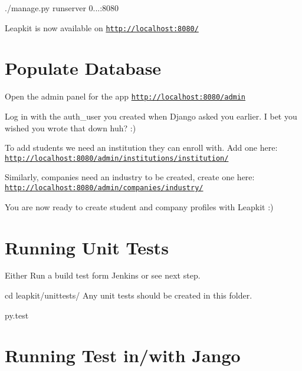 \begin{DoxyItemize}
\item {\ttfamily ./manage.py runserver 0...\-:8080}
\item Leapkit is now available on \href{http://localhost:8080/}{\tt http\-://localhost\-:8080/}
\end{DoxyItemize}

\section*{Populate Database }


\begin{DoxyItemize}
\item Open the admin panel for the app \href{http://localhost:8080/admin}{\tt http\-://localhost\-:8080/admin}
\item Log in with the auth\-\_\-user you created when Django asked you earlier. I bet you wished you wrote that down huh? \-:)
\item To add students we need an institution they can enroll with. Add one here\-: \href{http://localhost:8080/admin/institutions/institution/}{\tt http\-://localhost\-:8080/admin/institutions/institution/}
\item Similarly, companies need an industry to be created, create one here\-: \href{http://localhost:8080/admin/companies/industry/}{\tt http\-://localhost\-:8080/admin/companies/industry/}
\item You are now ready to create student and company profiles with Leapkit \-:)
\end{DoxyItemize}

\section*{Running Unit Tests }


\begin{DoxyItemize}
\item Either Run a build test form Jenkins or see next step.
\item {\ttfamily cd leapkit/unittests/} Any unit tests should be created in this folder.
\item {\ttfamily py.\-test}
\end{DoxyItemize}

\section*{Running Test in/with Jango }


